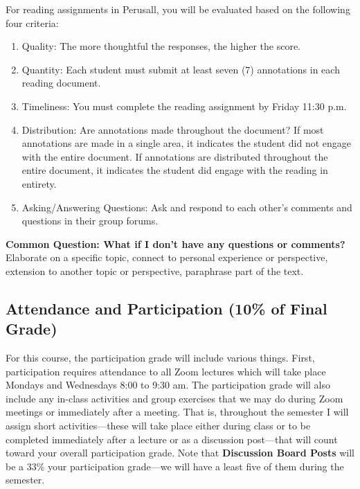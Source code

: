 \documentclass[11pt,]{article}
\providecommand{\tightlist}{%
  \setlength{\itemsep}{0pt}\setlength{\parskip}{0pt}}
\begin{document}
For reading assignments in Perusall, you will be evaluated based on the
following four criteria:

\begin{enumerate}
\def\labelenumi{\arabic{enumi}.}
\tightlist
\item
  Quality: The more thoughtful the responses, the higher the score.
\item
  Quantity: Each student must submit at least seven (7) annotations in
  each reading document.
\item
  Timeliness: You must complete the reading assignment by Friday 11:30
  p.m.
\item
  Distribution: Are annotations made throughout the document? If most
  annotations are made in a single area, it indicates the student did
  not engage with the entire document. If annotations are distributed
  throughout the entire document, it indicates the student did engage
  with the reading in entirety.
\item
  Asking/Answering Questions: Ask and respond to each other's comments
  and questions in their group forums.
\end{enumerate}

\textbf{Common Question: What if I don't have any questions or
comments?} Elaborate on a specific topic, connect to personal experience
or perspective, extension to another topic or perspective, paraphrase
part of the text.

\hypertarget{attendance-and-participation-10-of-final-grade}{%
\subsection{Attendance and Participation (10\% of Final
Grade)}\label{attendance-and-participation-10-of-final-grade}}

For this course, the participation grade will include various things.
First, participation requires attendance to all Zoom lectures which will
take place Mondays and Wednesdays 8:00 to 9:30 am. The participation
grade will also include any in-class activities and group exercises that
we may do during Zoom meetings or immediately after a meeting. That is,
throughout the semester I will assign short activities---these will take
place either during class or to be completed immediately after a lecture
or as a discussion post---that will count toward your overall
participation grade. Note that \textbf{Discussion Board Posts} will be a
33\% your participation grade---we will have a least five of them during
the semester.
\end{document}
